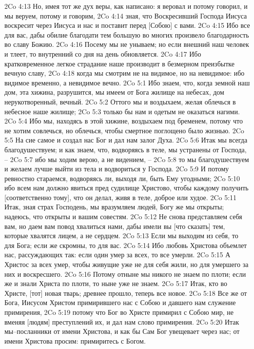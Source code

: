 2Co 4:13  Но, имея тот же дух веры, как написано: я веровал и потому говорил, и мы веруем, потому и говорим,
2Co 4:14  зная, что Воскресивший Господа Иисуса воскресит через Иисуса и нас и поставит перед [Собою] с вами.
2Co 4:15  Ибо все для вас, дабы обилие благодати тем большую во многих произвело благодарность во славу Божию.
2Co 4:16  Посему мы не унываем; но если внешний наш человек и тлеет, то внутренний со дня на день обновляется.
2Co 4:17  Ибо кратковременное легкое страдание наше производит в безмерном преизбытке вечную славу,
2Co 4:18  когда мы смотрим не на видимое, но на невидимое: ибо видимое временно, а невидимое вечно.
2Co 5:1  Ибо знаем, что, когда земной наш дом, эта хижина, разрушится, мы имеем от Бога жилище на небесах, дом нерукотворенный, вечный.
2Co 5:2  Оттого мы и воздыхаем, желая облечься в небесное наше жилище;
2Co 5:3  только бы нам и одетым не оказаться нагими.
2Co 5:4  Ибо мы, находясь в этой хижине, воздыхаем под бременем, потому что не хотим совлечься, но облечься, чтобы смертное поглощено было жизнью.
2Co 5:5  На сие самое и создал нас Бог и дал нам залог Духа.
2Co 5:6  Итак мы всегда благодушествуем; и как знаем, что, водворяясь в теле, мы устранены от Господа, --
2Co 5:7  ибо мы ходим верою, а не видением, --
2Co 5:8  то мы благодушествуем и желаем лучше выйти из тела и водвориться у Господа.
2Co 5:9  И потому ревностно стараемся, водворяясь ли, выходя ли, быть Ему угодными;
2Co 5:10  ибо всем нам должно явиться пред судилище Христово, чтобы каждому получить [соответственно тому], что он делал, живя в теле, доброе или худое.
2Co 5:11  Итак, зная страх Господень, мы вразумляем людей, Богу же мы открыты; надеюсь, что открыты и вашим совестям.
2Co 5:12  Не снова представляем себя вам, но даем вам повод хвалиться нами, дабы имели вы [что сказать] тем, которые хвалятся лицем, а не сердцем.
2Co 5:13  Если мы выходим из себя, то для Бога; если же скромны, то для вас.
2Co 5:14  Ибо любовь Христова объемлет нас, рассуждающих так: если один умер за всех, то все умерли.
2Co 5:15  А Христос за всех умер, чтобы живущие уже не для себя жили, но для умершего за них и воскресшего.
2Co 5:16  Потому отныне мы никого не знаем по плоти; если же и знали Христа по плоти, то ныне уже не знаем.
2Co 5:17  Итак, кто во Христе, [тот] новая тварь; древнее прошло, теперь все новое.
2Co 5:18  Все же от Бога, Иисусом Христом примирившего нас с Собою и давшего нам служение примирения,
2Co 5:19  потому что Бог во Христе примирил с Собою мир, не вменяя [людям] преступлений их, и дал нам слово примирения.
2Co 5:20  Итак мы--посланники от имени Христова, и как бы Сам Бог увещевает через нас; от имени Христова просим: примиритесь с Богом.
